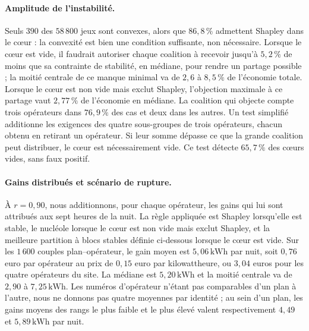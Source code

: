 \paragraph{Amplitude de l'instabilité.}
Seuls \(390\) des \(58\,800\) jeux sont convexes, alors que \(86{,}8\,\%\)
admettent Shapley dans le cœur : la convexité est bien une condition
suffisante, non nécessaire. Lorsque le cœur est vide, il faudrait autoriser
chaque coalition à recevoir jusqu'à \(5{,}2\,\%\) de moins que sa contrainte
de stabilité, en médiane, pour rendre un partage possible ; la moitié centrale
de ce manque minimal va de \(2{,}6\) à \(8{,}5\,\%\) de l'économie totale.
Lorsque le cœur est non vide mais exclut Shapley, l'objection
maximale à ce partage vaut \(2{,}77\,\%\) de l'économie en médiane. La
coalition qui objecte compte trois opérateurs dans \(76{,}9\,\%\) des cas et
deux dans les autres. Un test simplifié additionne les exigences des quatre
sous-groupes de trois opérateurs, chacun obtenu en retirant un opérateur. Si
leur somme dépasse ce que la grande coalition peut distribuer, le cœur est
nécessairement vide. Ce test détecte \(65{,}7\,\%\) des cœurs vides, sans faux
positif.

\paragraph{Gains distribués et scénario de rupture.}
À \(r=0{,}90\), nous additionnons, pour chaque opérateur, les gains qui lui
sont attribués aux sept heures de la nuit. La règle appliquée est Shapley
lorsqu'elle est stable, le nucléole lorsque le cœur est non vide mais exclut
Shapley, et la meilleure partition à blocs stables définie ci-dessous lorsque le cœur
est vide. Sur
les \(1\,600\) couples plan--opérateur, le gain moyen est
\(5{,}06\,\mathrm{kWh}\) par nuit, soit \(0{,}76\) euro par opérateur au prix
de \(0{,}15\) euro par kilowattheure, ou \(3{,}04\) euros pour les quatre opérateurs du site.
La médiane est \(5{,}20\,\mathrm{kWh}\) et la moitié
centrale va de \(2{,}90\) à \(7{,}25\,\mathrm{kWh}\). Les numéros
d'opérateur n'étant pas comparables d'un plan à l'autre, nous ne donnons pas
quatre moyennes par identité ; au sein d'un plan, les gains moyens des rangs
le plus faible et le plus élevé valent respectivement \(4{,}49\) et
\(5{,}89\,\mathrm{kWh}\) par nuit.

